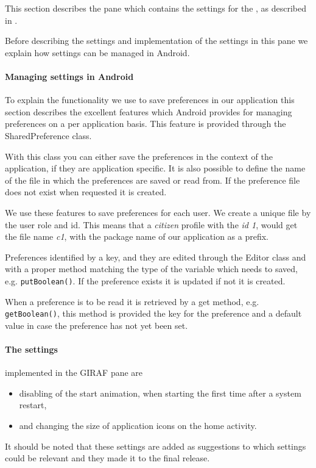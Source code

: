 This section describes the pane which contains the settings for the \launcher, as described in .

Before describing the settings and implementation of the settings in this pane we explain how settings can be managed in Android.

\paragraph{Managing settings in Android}\label{para:sprint4:managingsettingsandroid}
To explain the functionality we use to save preferences in our application this section describes the excellent features which Android provides for managing preferences on a per application basis. This feature is provided through the SharedPreference class.

With this class you can either save the preferences in the context of the application, if they are application specific. It is also possible to define the name of the file in which the preferences are saved or read from. If the preference file does not exist when requested it is created.

We use these features to save preferences for each user. We create a unique file by the user role and id.
This means that a \textit{citizen} profile with the \textit{id 1}, would get the file name \textit{c1}, with the package name of our application as a prefix.

Preferences identified by a key, and they are edited through the Editor class and with a proper method matching the type of the variable which needs to saved, e.g. \lstinline!putBoolean()!.
If the preference exists it is updated if not it is created.

When a preference is to be read it is retrieved by a get method, e.g. \lstinline!getBoolean()!, this method is provided the key for the preference and a default value in case the preference has not yet been set.

\paragraph{The settings} implemented in the GIRAF pane are
\begin{itemize}
 	\item disabling of the start animation, when starting \launcher the first time after a system restart,
 	\item and changing the size of application icons on the home activity.
 \end{itemize} 
It should be noted that these settings are added as suggestions to which settings could be relevant and they made it to the final release.

